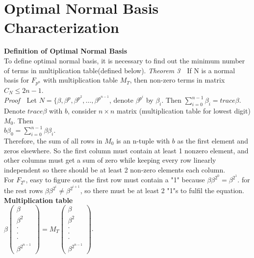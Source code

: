 \documentclass[12pt]{article}
\begin{document}
\section{Optimal Normal Basis Characterization}
\textbf{Definition of Optimal Normal Basis}\\
To define optimal normal basis, it is necessary to find out the minimum number
of terms in multiplication table(defined below).
\textit{Theorem 3}\ \ If N is a normal basis for $F_{p^n}$ with multiplication table $M_T$, then non-zero terms in 
matrix $C_N\leq 2n-1$.\\
\textit{Proof}\ \ Let $N = \{\beta, \beta^p, \beta^{p^2},\dots, \beta^{p^{n-1}}$, denote $\beta^{p^i}$ by $\beta_i$. 
Then $\sum_{i=0}^{n-1} \beta_i = trace \beta$. \\
Denote $trace \beta$ with $b$, consider $n\times n$ matrix (multiplication table for lowest digit) $M_0$. Then\\
$b\beta_0 = \sum_{i=0}^{n-1} \beta \beta_i$.\\
Therefore, the sum of all rows in $M_0$ is an n-tuple with $b$ as the first element and zeros elsewhere.
So the first column must contain at least 1 nonzero element, and other columns must get a sum of zero 
while keeping every row linearly independent so there should be at least 2 non-zero elements each column.\\
For $F_{2^n}$, easy to figure out the first row must contain a "1" because $\beta \beta^{2^0} = \beta^{2^1}$.
for the rest rows $\beta \beta^{2^i} \neq \beta^{2^{i+1}}$,
so there must be at least 2 "1"s to fulfil the equation.\\
\textbf{Multiplication table}\\
$\beta \left( \begin{array} {lcr}
 \beta \\ 
\beta^2 \\ 
\cdot \\ 
\cdot \\ 
\cdot \\ 
\beta^{2^{n-1}} 
\end{array} \right) = M_T \left( \begin{array} {lcr}
 \beta \\ 
\beta^2 \\ 
\cdot \\ 
\cdot \\ 
\cdot \\ 
\beta^{2^{n-1}} 
\end{array} \right)$. \\
\end{document}
